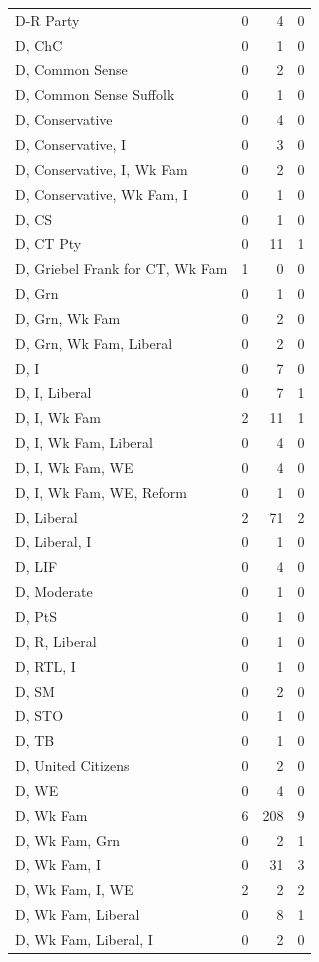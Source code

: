 \begin{supertabular}{lrrr}
D-R Party & 0 & 4 & 0\\
D, ChC & 0 & 1 & 0\\
D, Common Sense & 0 & 2 & 0\\
D, Common Sense Suffolk & 0 & 1 & 0\\
D, Conservative & 0 & 4 & 0\\
D, Conservative, I & 0 & 3 & 0\\
D, Conservative, I, Wk Fam & 0 & 2 & 0\\
D, Conservative, Wk Fam, I & 0 & 1 & 0\\
D, CS & 0 & 1 & 0\\
D, CT Pty & 0 & 11 & 1\\
D, Griebel Frank for CT, Wk Fam & 1 & 0 & 0\\
D, Grn & 0 & 1 & 0\\
D, Grn, Wk Fam & 0 & 2 & 0\\
D, Grn, Wk Fam, Liberal & 0 & 2 & 0\\
D, I & 0 & 7 & 0\\
D, I, Liberal & 0 & 7 & 1\\
D, I, Wk Fam & 2 & 11 & 1\\
D, I, Wk Fam, Liberal & 0 & 4 & 0\\
D, I, Wk Fam, WE & 0 & 4 & 0\\
D, I, Wk Fam, WE, Reform & 0 & 1 & 0\\
D, Liberal & 2 & 71 & 2\\
D, Liberal, I & 0 & 1 & 0\\
D, LIF & 0 & 4 & 0\\
D, Moderate & 0 & 1 & 0\\
D, PtS & 0 & 1 & 0\\
D, R, Liberal & 0 & 1 & 0\\
D, RTL, I & 0 & 1 & 0\\
D, SM & 0 & 2 & 0\\
D, STO & 0 & 1 & 0\\
D, TB & 0 & 1 & 0\\
D, United Citizens & 0 & 2 & 0\\
D, WE & 0 & 4 & 0\\
D, Wk Fam & 6 & 208 & 9\\
D, Wk Fam, Grn & 0 & 2 & 1\\
D, Wk Fam, I & 0 & 31 & 3\\
D, Wk Fam, I, WE & 2 & 2 & 2\\
D, Wk Fam, Liberal & 0 & 8 & 1\\
D, Wk Fam, Liberal, I & 0 & 2 & 0\\

\end{supertabular}
